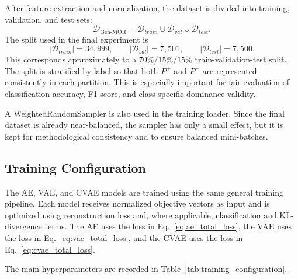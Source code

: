 After feature extraction and normalization, the dataset is divided into training, validation, and test sets:
\begin{equation}
    \mathcal{D}_{\text{Gen-MOR}}
    =
    \mathcal{D}_{train}
    \cup
    \mathcal{D}_{val}
    \cup
    \mathcal{D}_{test}.
    \label{eq:train_val_test_split}
\end{equation}
The split used in the final experiment is
\begin{equation}
    |\mathcal{D}_{train}| = 34{,}999,
    \qquad
    |\mathcal{D}_{val}| = 7{,}501,
    \qquad
    |\mathcal{D}_{test}| = 7{,}500.
    \label{eq:split_counts}
\end{equation}
This corresponds approximately to a $70\%/15\%/15\%$ train-validation-test split. The split is stratified by label so that both $P^{+}$ and $P^{-}$ are represented consistently in each partition. This is especially important for fair evaluation of classification accuracy, F1 score, and class-specific dominance validity.

A WeightedRandomSampler is also used in the training loader. Since the final dataset is already near-balanced, the sampler has only a small effect, but it is kept for methodological consistency and to ensure balanced mini-batches.

\subsection{Training Configuration}
\label{subsec:training_configuration}

The AE, VAE, and CVAE models are trained using the same general training pipeline. Each model receives normalized objective vectors as input and is optimized using reconstruction loss and, where applicable, classification and KL-divergence terms. The AE uses the loss in Eq.~\eqref{eq:ae_total_loss}, the VAE uses the loss in Eq.~\eqref{eq:vae_total_loss}, and the CVAE uses the loss in Eq.~\eqref{eq:cvae_total_loss}.

The main hyperparameters are recorded in Table~\ref{tab:training_configuration}.

